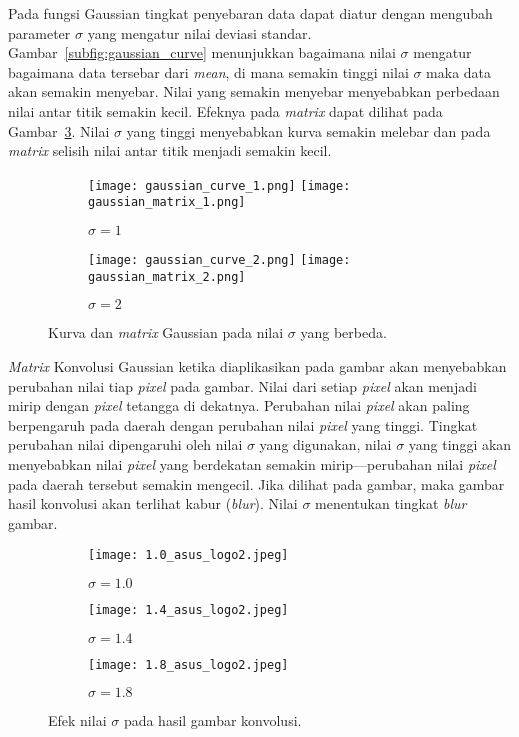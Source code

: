 Pada fungsi Gaussian tingkat penyebaran data dapat diatur dengan mengubah parameter $\sigma$ yang mengatur nilai deviasi standar. Gambar~\ref{subfig:gaussian_curve} menunjukkan bagaimana nilai $\sigma$ mengatur bagaimana data tersebar dari \textit{mean}, di mana semakin tinggi nilai $\sigma$ maka data akan semakin menyebar. Nilai yang semakin menyebar menyebabkan perbedaan nilai antar titik semakin kecil. Efeknya pada \textit{matrix} dapat dilihat pada Gambar~\ref{fig:gaussian_sigma}. Nilai $\sigma$ yang tinggi menyebabkan kurva semakin melebar dan pada \textit{matrix} selisih nilai antar titik menjadi semakin kecil.

\begin{figure}[H]
	\begin{subfigure}[b]{.5\textwidth}
		\centering
		\texttt{[image: gaussian\_curve\_1.png]}
		\texttt{[image: gaussian\_matrix\_1.png]}
		\caption{$\sigma=1$}
		\label{subfig:gaussian_sigma1}
	\end{subfigure}%
	\begin{subfigure}[b]{.5\textwidth}
		\centering
		\texttt{[image: gaussian\_curve\_2.png]}
		\texttt{[image: gaussian\_matrix\_2.png]}
		\caption{$\sigma=2$}
		\label{subfig:gaussian_sigma2}
	\end{subfigure}
	\caption{Kurva dan \textit{matrix} Gaussian pada nilai $\sigma$ yang berbeda.}
	\label{fig:gaussian_sigma}
\end{figure}

\textit{Matrix} Konvolusi Gaussian ketika diaplikasikan pada gambar akan menyebabkan perubahan nilai tiap \textit{pixel} pada gambar. Nilai dari setiap \textit{pixel} akan menjadi mirip dengan \textit{pixel} tetangga di dekatnya. Perubahan nilai \textit{pixel} akan paling berpengaruh pada daerah dengan perubahan nilai \textit{pixel} yang tinggi. Tingkat perubahan nilai dipengaruhi oleh nilai $\sigma$ yang digunakan, nilai $\sigma$ yang tinggi akan menyebabkan nilai \textit{pixel} yang berdekatan semakin mirip---perubahan nilai \textit{pixel} pada daerah tersebut semakin mengecil. Jika dilihat pada gambar, maka gambar hasil konvolusi akan terlihat kabur (\textit{blur}). Nilai $\sigma$ menentukan tingkat \textit{blur} gambar.

\begin{figure}[H]
	\centering
	\begin{subfigure}[b]{.33\textwidth}
		\centering
		\texttt{[image: 1.0\_asus\_logo2.jpeg]}
		\caption{$\sigma=1.0$}
		\label{subfig:asus_sigma1.0}
	\end{subfigure}%
	\begin{subfigure}[b]{.33\textwidth}
		\centering
		\texttt{[image: 1.4\_asus\_logo2.jpeg]}
		\caption{$\sigma=1.4$}
		\label{subfig:asus_sigma1.4}
	\end{subfigure}
	\begin{subfigure}[b]{.33\textwidth}
		\centering
		\texttt{[image: 1.8\_asus\_logo2.jpeg]}
		\caption{$\sigma=1.8$}
		\label{subfig:asus_sigma1.8}
	\end{subfigure}
	\caption{Efek nilai $\sigma$ pada hasil gambar konvolusi.}
	\label{fig:asus_konv}
\end{figure}

